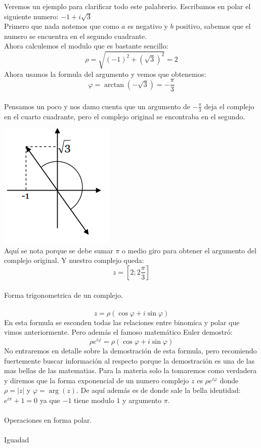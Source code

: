 \documentclass[]{article}
\begin{document}
Veremos un ejemplo para clarificar todo este palabrerio. Escribamos en polar el siguiente numero: $-1 + i \sqrt{3}$
\\
Primero que nada notemos que como $a$ es negativo y $b$ positivo, sabemos que el numero se encuentra en el segundo cuadrante.
\\
Ahora calculemos el modulo que es bastante sencillo:
$$
\rho =  \sqrt{(-1)^{2} + (\sqrt{3})^{2}} = 2
$$
Ahora usamos la formula del argumento y vemos que obtenemos:
$$
\varphi = \arctan(-\sqrt{3}) = -\frac{\pi}{3}
$$
\\
Pensamos un poco y nos damo cuenta que un argumento de $-\frac{\pi}{3}$ deja el complejo en el cuarto cuadrante, pero el complejo original se encontraba en el segundo.

\includegraphics{../../../Imagenes/Superior/Complejos/Complejos03.PNG}
\\
Aquí se nota porque se debe sumar $\pi$ o medio giro para obtener el argumento del complejo original. Y nuestro complejo queda:
$$
z = [2 ; 2\frac{\pi}{3}]
$$
\\
\huge Forma trigonometrica de un complejo.
\normalsize
\\
\\
$$
z = \rho (\cos\varphi + i \sin\varphi)
$$
En esta formula se esconden todas las relaciones entre binomica y polar que vimos anteriormente. Pero además el famoso matemático Euler demostró:
$$
\rho e^{i\varphi} = \rho (\cos\varphi + i \sin\varphi)
$$
No entraremos en detalle sobre la demostración de esta formula, pero recomiendo fuertemente buscar información al respecto porque la demostración es una de las mas bellas de las matematias. Para la materia solo la tomaremos como verdadera y diremos que la forma exponencial de un numero complejo $z$ es $\rho e^{i\varphi}$ donde $\rho = |z|$ y $\varphi = \arg(z)$. De aquí además es de donde sale la bella identidad: $e^{i\pi} + 1 = 0 $ ya que $-1$ tiene modulo $1$ y argumento $\pi$.
\\
\\
\huge Operaciones en forma polar.
\\
\\
\Large Iguadad
\end{document}
